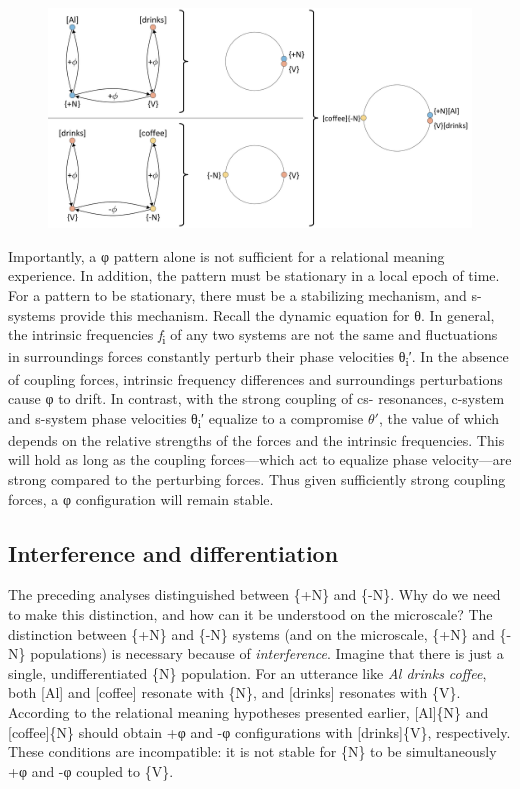   
\begin{figure}
\includegraphics[width=\textwidth]{figures/Tilsen-img22.png}
\caption{\missingcaption}
\label{fig:2:15}
\end{figure}
 

  Importantly, a φ pattern alone is not sufficient for a relational meaning experience. In addition, the pattern must be stationary in a local epoch of time. For a pattern to be stationary, there must be a stabilizing mechanism, and s-systems provide this mechanism. Recall the dynamic equation for θ. In general, the intrinsic frequencies \textit{f}\textsubscript{i} of any two systems are not the same and fluctuations in surroundings forces constantly perturb their phase velocities θ\textsubscript{i}′. In the absence of coupling forces, intrinsic frequency differences and surroundings perturbations cause φ to drift. In contrast, with the strong coupling of cs- resonances, c-system and s-system phase velocities θ\textsubscript{i}′ equalize to a compromise $\theta ′$, the value of which depends on the relative strengths of the forces and the intrinsic frequencies. This will hold as long as the coupling forces—which act to equalize phase velocity—are strong compared to the perturbing forces. Thus given sufficiently strong coupling forces, a φ configuration will remain stable.

\subsection{Interference and differentiation}

The preceding analyses distinguished between \{+N\} and \{-N\}. Why do we need to make this distinction, and how can it be understood on the microscale? The distinction between \{+N\} and \{-N\} systems (and on the microscale, \{+N\} and \{-N\} populations) is necessary because of \textit{interference}. Imagine that there is just a single, undifferentiated \{N\} population. For an utterance like \textit{Al drinks coffee}, both [Al] and [coffee] resonate with \{N\}, and [drinks] resonates with \{V\}. According to the relational meaning hypotheses presented earlier, [Al]\{N\} and [coffee]\{N\} should obtain +φ and -φ configurations with [drinks]\{V\}, respectively. These conditions are incompatible: it is not stable for \{N\} to be simultaneously +φ and -φ coupled to \{V\}.

